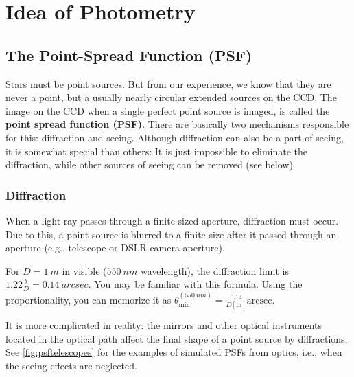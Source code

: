 \chapter{Idea of Photometry}

\section{The Point-Spread Function (PSF)}

Stars must be point sources. But from our experience, we know that they are never a point, but a usually nearly circular extended sources on the CCD. The image on the CCD when a single perfect point source is imaged, is called the \textbf{point spread function (PSF)}. There are basically two mechanisms responsible for this: diffraction and seeing. Although diffraction can also be a part of seeing, it is somewhat special than others: It is just impossible to eliminate the diffraction, while other sources of seeing can be removed (see below).

\subsection{Diffraction}
When a light ray passes through a finite-sized aperture, diffraction must occur. Due to this, a point source is blurred to a finite size after it passed through an aperture (e.g., telescope or DSLR camera aperture). 

\begin{ex}[Diffraction]
	For $ D = \SI{1}{m} $ in visible ($ \SI{550}{nm} $ wavelength), the diffraction limit is $ 1.22 \frac{\lambda}{D} = \SI{0.14}{arcsec}$. You may be familiar with this formula. Using the proportionality, you can memorize it as $ \theta_\mathrm{min}^{(\SI{550}{nm})} = \frac{0.14}{D\mathrm{[m]}} \mathrm{arcsec}$.
\end{ex}

It is more complicated in reality: the mirrors and other optical instruments located in the optical path affect the final shape of a point source by diffractions. See \cref{fig:psftelescopes} for the examples of simulated PSFs from optics, i.e., when the seeing effects are neglected.

